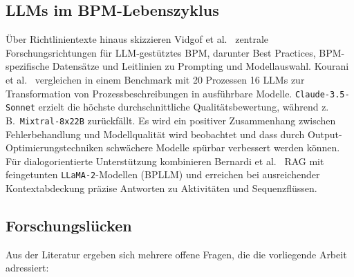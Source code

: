 \subsection*{\acp{LLM} im BPM-Lebenszyklus}

Über Richtlinientexte hinaus skizzieren Vidgof et al.\ \cite{vidgof2023largelanguagemodelsbusiness} zentrale Forschungsrichtungen für \ac{LLM}-gestütztes \ac{BPM}, darunter Best Practices, \ac{BPM}-spezifische Datensätze und Leitlinien zu Prompting und Modellauswahl. Kourani et al.\ \cite{kourani2025evaluating} vergleichen in einem Benchmark mit 20 Prozessen 16 \acp{LLM} zur Transformation von Prozessbeschreibungen in ausführbare Modelle. \texttt{Claude-3.5-Sonnet} erzielt die höchste durchschnittliche Qualitätsbewertung, während z.\,B.\ \texttt{Mixtral-8x22B} zurückfällt. Es wird ein positiver Zusammenhang zwischen Fehlerbehandlung und Modellqualität wird beobachtet und dass durch Output-Optimierungstechniken schwächere Modelle spürbar verbessert werden können. Für dialogorientierte Unterstützung kombinieren Bernardi et al.\ \cite{bernardi2024conversing} \ac{RAG} mit feingetunten \texttt{LLaMA-2}-Modellen (BPLLM) und erreichen bei ausreichender Kontextabdeckung präzise Antworten zu Aktivitäten und Sequenzflüssen.

\subsection*{Forschungslücken}

Aus der Literatur ergeben sich mehrere offene Fragen, die die vorliegende Arbeit adressiert:

